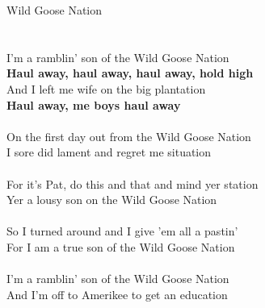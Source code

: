 \documentclass[letterpaper,9pt]{article}
\begin{document}
\newpage
{}
\huge
Wild Goose Nation\\
\\
\huge
\\I'm a ramblin' son of the Wild Goose Nation
\\\textbf{Haul away, haul away, haul away, hold high}
\\And I left me wife on the big plantation
\\\textbf{Haul away, me boys haul away}
\\
\\On the first day out from the Wild Goose Nation
\\I sore did lament and regret me situation
\\
\\For it's Pat, do this and that and mind yer station
\\Yer a lousy son on the Wild Goose Nation
\\
\\So I turned around and I give 'em all a pastin'
\\For I am a true son of the Wild Goose Nation
\\
\\I'm a ramblin' son of the Wild Goose Nation
\\And I'm off to Amerikee to get an education
\end{document}
